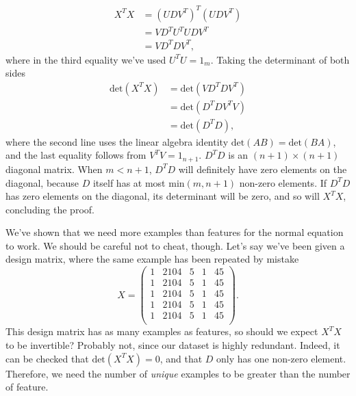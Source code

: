 \documentclass{article}
\theoremstyle{definition}
\begin{document}
\begin{align*}
    X^TX &= (UDV^T)^T(UDV^T)\\
    &= VD^TU^TUDV^T \\
    &=VD^TDV^T,
\end{align*}
where in the third equality we've used $U^TU=1_m$. Taking the determinant of both sides
\begin{align*}
    \text{det}(X^TX) &= \text{det}(VD^TDV^T)\\
    &= \text{det}(D^TDV^TV) \\
    &= \text{det}(D^TD),
\end{align*}
where the second line uses the linear algebra identity $\text{det}(AB)=\text{det}(BA)$, and the last equality follows from $V^TV=1_{n+1}$. $D^TD$ is an $(n+1)\times(n+1)$ diagonal matrix. When $m<n+1$, $D^TD$ will definitely have zero elements on the diagonal, because $D$ itself has at most $\text{min}(m,n+1)$ non-zero elements. If $D^TD$ has zero elements on the diagonal, its determinant will be zero, and so will $X^TX$, concluding the proof.

We've shown that we need more examples than features for the normal equation to work. We should be careful not to cheat, though. Let's say we've been given a design matrix, where the same example has been repeated by mistake
\begin{equation}
        X =
    \begin{pmatrix}
        1 & 2104 & 5 & 1 & 45 \\
        1 & 2104 & 5 & 1 & 45 \\
        1 & 2104 & 5 & 1 & 45 \\
        1 & 2104 & 5 & 1 & 45 \\
        1 & 2104 & 5 & 1 & 45 \\
    \end{pmatrix}.
\end{equation}
This design matrix has as many examples as features, so should we expect $X^TX$ to be invertible? Probably not, since our dataset is highly redundant. Indeed, it can be checked that $\text{det}(X^TX)=0$, and that $D$ only has one non-zero element. Therefore, we need the number of \textit{unique} examples to be greater than the number of feature.
\end{document}
